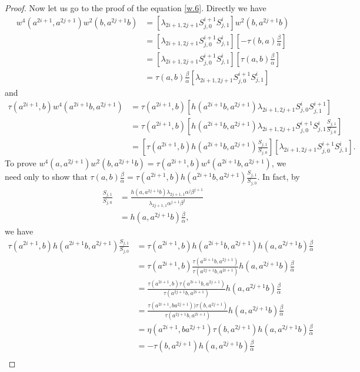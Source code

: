 \documentclass[a4paper,11pt]{amsart}
\numberwithin{equation}{section}
\begin{document}
\begin{proof}
Now let us go to the proof of the equation \eqref{w.6}. Directly we have
\begin{align*}
w^4(a^{2i+1},a^{2j+1}) w^2(b,a^{2j+1}b)&=[\lambda_{2i+1,2j+1} S_{j,0}^{i+1} S_{j,1}^i] w^2(b,a^{2j+1}b)\\
&=[\lambda_{2i+1,2j+1} S_{j,0}^{i+1} S_{j,1}^i] [-\tau(b,a)\frac{\beta}{\alpha}]\\
&=[\lambda_{2i+1,2j+1} S_{j,0}^{i+1} S_{j,1}^i] [\tau(a,b)\frac{\beta}{\alpha}]\\
&=\tau(a,b)\frac{\beta}{\alpha} [\lambda_{2i+1,2j+1} S_{j,0}^{i+1} S_{j,1}^i]
\end{align*}
and
\begin{align*}
\tau(a^{2i+1},b) w^4(a^{2i+1}b,a^{2j+1})&=\tau(a^{2i+1},b) [h(a^{2i+1}b,a^{2j+1}) \lambda_{2i+1,2j+1} S_{j,0}^{i} S_{j,1}^{i+1}]\\
&=\tau(a^{2i+1},b) [h(a^{2i+1}b,a^{2j+1}) \lambda_{2i+1,2j+1} S_{j,0}^{i+1} S_{j,1}^{i} \frac{S_{j,1}}{S_{j,0}}]\\
&=[\tau(a^{2i+1},b) h(a^{2i+1}b,a^{2j+1}) \frac{S_{j,1}}{S_{j,0}}] [\lambda_{2i+1,2j+1} S_{j,0}^{i+1} S_{j,1}^{i}].
\end{align*}
To prove $w^4(a,a^{2j+1}) w^2(b,a^{2j+1}b)=\tau(a^{2i+1},b) w^4(a^{2i+1}b,a^{2j+1})$, we need only to show that $\tau(a,b)\frac{\beta}{\alpha}=\tau(a^{2i+1},b) h(a^{2i+1}b,a^{2j+1}) \frac{S_{j,1}}{S_{j,0}}$. In fact, by
\begin{align*}
\frac{S_{j,1}}{S_{j,0}}&=\frac{h(a,a^{2j+1}b) \lambda_{2j+1,1} \alpha^j \beta^{j+1}}{\lambda_{2j+1,1} \alpha^{j+1} \beta^{j}}\\
&=h(a,a^{2j+1}b) \frac{\beta}{\alpha},
\end{align*}
we have
\begin{align*}
\tau(a^{2i+1},b) h(a^{2i+1}b,a^{2j+1}) \frac{S_{j,1}}{S_{j,0}}&=\tau(a^{2i+1},b) h(a^{2i+1}b,a^{2j+1}) h(a,a^{2j+1}b) \frac{\beta}{\alpha}\\
&=\tau(a^{2i+1},b) \frac{\tau(a^{2i+1}b,a^{2j+1})}{\tau(a^{2j+1}b,a^{2i+1})} h(a,a^{2j+1}b) \frac{\beta}{\alpha}\\
&=\frac{\tau(a^{2i+1},b) \tau(a^{2i+1}b,a^{2j+1})}{\tau(a^{2j+1}b,a^{2i+1})} h(a,a^{2j+1}b) \frac{\beta}{\alpha}\\
&=\frac{\tau(a^{2i+1},ba^{2j+1})) \tau(b,a^{2j+1})}{\tau(a^{2j+1}b,a^{2i+1})} h(a,a^{2j+1}b) \frac{\beta}{\alpha}\\
&=\eta(a^{2i+1},ba^{2j+1}) \tau(b,a^{2j+1}) h(a,a^{2j+1}b) \frac{\beta}{\alpha}\\
&=-\tau(b,a^{2j+1}) h(a,a^{2j+1}b) \frac{\beta}{\alpha}\\

\end{align*}
\end{proof}
\end{document}
